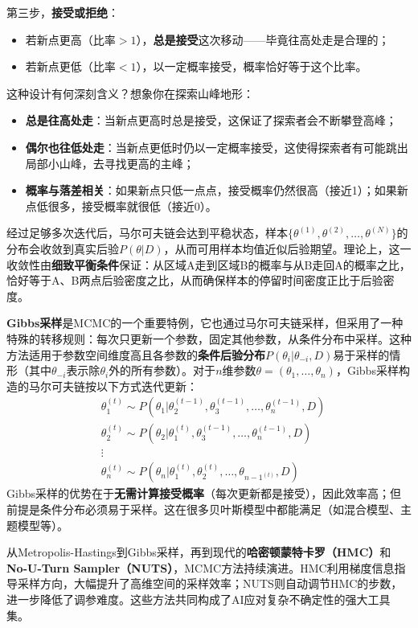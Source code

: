 第三步，\textbf{接受或拒绝}：
\begin{itemize}
  \item 若新点更高（比率$> 1$），\textbf{总是接受}这次移动——毕竟往高处走是合理的；
  \item 若新点更低（比率$< 1$），以一定概率接受，概率恰好等于这个比率。
\end{itemize}

这种设计有何深刻含义？想象你在探索山峰地形：
\begin{itemize}
  \item \textbf{总是往高处走}：当新点更高时总是接受，这保证了探索者会不断攀登高峰；
  \item \textbf{偶尔也往低处走}：当新点更低时仍以一定概率接受，这使得探索者有可能跳出局部小山峰，去寻找更高的主峰；
  \item \textbf{概率与落差相关}：如果新点只低一点点，接受概率仍然很高（接近1）；如果新点低很多，接受概率就很低（接近0）。
\end{itemize}

经过足够多次迭代后，马尔可夫链会达到平稳状态，样本$\{\theta^{(1)}, \theta^{(2)}, \ldots, \theta^{(N)}\}$的分布会收敛到真实后验$P(\theta|D)$，从而可用样本均值近似后验期望。理论上，这一收敛性由\textbf{细致平衡条件}保证：从区域A走到区域B的概率与从B走回A的概率之比，恰好等于A、B两点后验密度之比，从而确保样本的停留时间密度正比于后验密度。

\textbf{Gibbs采样}是MCMC的一个重要特例，它也通过马尔可夫链采样，但采用了一种特殊的转移规则：每次只更新一个参数，固定其他参数，从条件分布中采样。这种方法适用于参数空间维度高且各参数的\textbf{条件后验分布}$P(\theta_i | \theta_{-i}, D)$易于采样的情形（其中$\theta_{-i}$表示除$\theta_i$外的所有参数）。对于$n$维参数$\theta = (\theta_1, \ldots, \theta_n)$，Gibbs采样构造的马尔可夫链按以下方式迭代更新：
\begin{align*}
& \theta_1^{(t)} \sim P(\theta_1 | \theta_2^{(t-1)}, \theta_3^{(t-1)}, \ldots, \theta_n^{(t-1)}, D) \\
& \theta_2^{(t)} \sim P(\theta_2 | \theta_1^{(t)}, \theta_3^{(t-1)}, \ldots, \theta_n^{(t-1)}, D) \\
& \vdots \\
& \theta_n^{(t)} \sim P(\theta_n | \theta_1^{(t)}, \theta_2^{(t)}, \ldots, \theta_{n-1^{(t)}}, D)
\end{align*}
Gibbs采样的优势在于\textbf{无需计算接受概率}（每次更新都是接受），因此效率高；但前提是条件分布必须易于采样。这在很多贝叶斯模型中都能满足（如混合模型、主题模型等）。

从Metropolis-Hastings到Gibbs采样，再到现代的\textbf{哈密顿蒙特卡罗（HMC）}和\textbf{No-U-Turn Sampler（NUTS）}，MCMC方法持续演进。HMC利用梯度信息指导采样方向，大幅提升了高维空间的采样效率；NUTS则自动调节HMC的步数，进一步降低了调参难度。这些方法共同构成了AI应对复杂不确定性的强大工具集。

